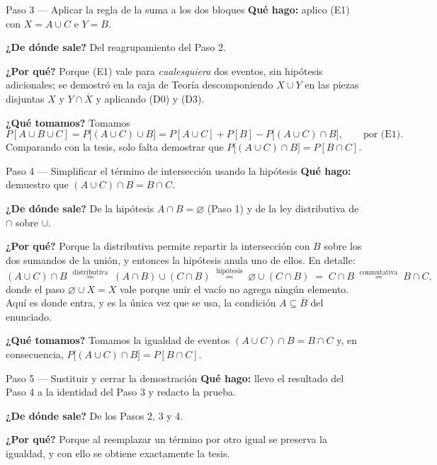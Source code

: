 \documentclass[11pt]{article}
\begin{document}
\begin{sol}
\begin{paso}{Paso 3 --- Aplicar la regla de la suma a los dos bloques}
\textbf{Qué hago:} aplico (E1) con $X=A\cup C$ e $Y=B$.

\textbf{¿De dónde sale?} Del reagrupamiento del Paso 2.

\textbf{¿Por qué?} Porque (E1) vale para \emph{cualesquiera} dos eventos, sin hipótesis
adicionales; se demostró en la caja de Teoría descomponiendo $X\cup Y$ en las piezas disjuntas
$X$ y $Y\cap\overline{X}$ y aplicando (D0) y (D3).

\textbf{¿Qué tomamos?} Tomamos
\[
P[A\cup B\cup C]=P\big[(A\cup C)\cup B\big]
=P[A\cup C]+P[B]-P\big[(A\cup C)\cap B\big] , \qquad\text{por (E1)} .
\]
Comparando con la tesis, solo falta demostrar que $P\big[(A\cup C)\cap B\big]=P[B\cap C]$.
\end{paso}

\begin{paso}{Paso 4 --- Simplificar el término de intersección usando la hipótesis}
\textbf{Qué hago:} demuestro que $(A\cup C)\cap B=B\cap C$.

\textbf{¿De dónde sale?} De la hipótesis $A\cap B=\varnothing$ (Paso 1) y de la ley distributiva
de $\cap$ sobre $\cup$.

\textbf{¿Por qué?} Porque la distributiva permite repartir la intersección con $B$ sobre los dos
sumandos de la unión, y entonces la hipótesis anula uno de ellos. En detalle:
\[
(A\cup C)\cap B
\;\overset{\text{distributiva}}{=}\;(A\cap B)\cup(C\cap B)
\;\overset{\text{hipótesis}}{=}\;\varnothing\cup(C\cap B)
\;=\;C\cap B
\;\overset{\text{conmutativa}}{=}\;B\cap C ,
\]
donde el paso $\varnothing\cup X=X$ vale porque unir el vacío no agrega ningún elemento. Aquí es
donde entra, y es la única vez que se usa, la condición $A\subseteq\overline{B}$ del enunciado.

\textbf{¿Qué tomamos?} Tomamos la igualdad de eventos $(A\cup C)\cap B=B\cap C$ y, en
consecuencia, $P\big[(A\cup C)\cap B\big]=P[B\cap C]$.
\end{paso}

\begin{paso}{Paso 5 --- Sustituir y cerrar la demostración}
\textbf{Qué hago:} llevo el resultado del Paso 4 a la identidad del Paso 3 y redacto la prueba.

\textbf{¿De dónde sale?} De los Pasos 2, 3 y 4.

\textbf{¿Por qué?} Porque al reemplazar un término por otro igual se preserva la igualdad, y con
ello se obtiene exactamente la tesis.


\end{paso}
\end{sol}
\end{document}

